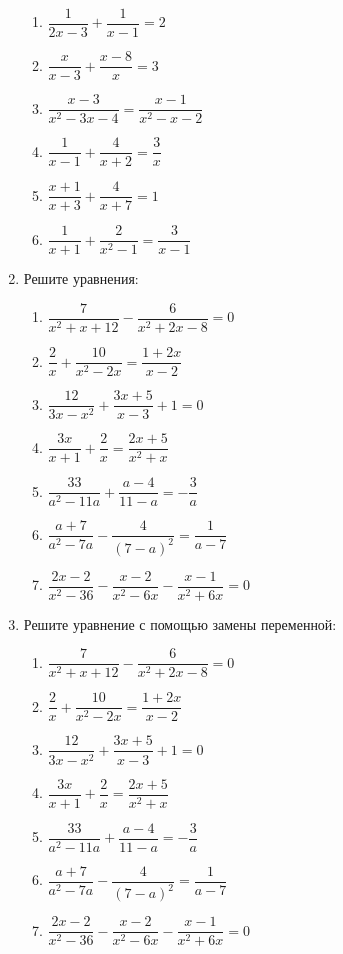 \documentclass[10pt, a4paper]{article}
\begin{document}
\begin{enumerate}
	\begin{multicols}{2}
		\begin{enumerate}[label=\asbuk*)]
			\item $\dfrac{1}{2x-3}+\dfrac{1}{x-1}=2$
			\item $\dfrac{x}{x-3}+\dfrac{x-8}{x}=3$
			\item $\dfrac{x-3}{x^2-3x-4}=\dfrac{x-1}{x^2-x-2}$
			\item $\dfrac{1}{x-1}+\dfrac{4}{x+2}=\dfrac{3}{x}$
			\item $\dfrac{x+1}{x+3}+\dfrac{4}{x+7}=1$
			\item $\dfrac{1}{x+1}+\dfrac{2}{x^2-1}=\dfrac{3}{x-1}$
		\end{enumerate}
	\end{multicols}
	\item Решите уравнения:
	\begin{multicols}{2}
		\begin{enumerate}[label=\asbuk*)]
			\item $\dfrac{7}{x^2+x+12}-\dfrac{6}{x^2+2x-8}=0$
			\item $\dfrac{2}{x}+\dfrac{10}{x^2-2x}=\dfrac{1+2x}{x-2}$
			\item $\dfrac{12}{3x-x^2}+\dfrac{3x+5}{x-3}+1=0$
			\item $\dfrac{3x}{x+1}+\dfrac{2}{x}=\dfrac{2x+5}{x^2+x}$
			\item $\dfrac{33}{a^2-11a}+\dfrac{a-4}{11-a}=-\dfrac{3}{a}$
			\item $\dfrac{a+7}{a^2-7a}-\dfrac{4}{(7-a)^2}=\dfrac{1}{a-7}$
			\item $\dfrac{2x-2}{x^2-36}-\dfrac{x-2}{x^2-6x}-\dfrac{x-1}{x^2+6x}=0$
		\end{enumerate}
	\end{multicols}
	\item Решите уравнение с помощью замены переменной:
	\begin{multicols}{2}
		\begin{enumerate}[label=\asbuk*)]
			\item $\dfrac{7}{x^2+x+12}-\dfrac{6}{x^2+2x-8}=0$
			\item $\dfrac{2}{x}+\dfrac{10}{x^2-2x}=\dfrac{1+2x}{x-2}$
			\item $\dfrac{12}{3x-x^2}+\dfrac{3x+5}{x-3}+1=0$
			\item $\dfrac{3x}{x+1}+\dfrac{2}{x}=\dfrac{2x+5}{x^2+x}$
			\item $\dfrac{33}{a^2-11a}+\dfrac{a-4}{11-a}=-\dfrac{3}{a}$
			\item $\dfrac{a+7}{a^2-7a}-\dfrac{4}{(7-a)^2}=\dfrac{1}{a-7}$
			\item $\dfrac{2x-2}{x^2-36}-\dfrac{x-2}{x^2-6x}-\dfrac{x-1}{x^2+6x}=0$
		\end{enumerate}
	\end{multicols}
\end{enumerate}
\end{document}
